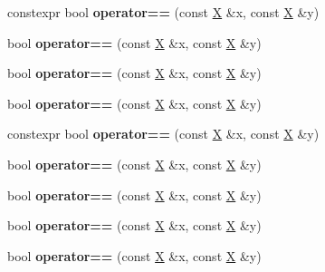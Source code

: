\begin{DoxyCompactItemize}
\item 
\mbox{\label{class_x_a9d441e76e2ab7afd90f64e49f2809fc7}} 
constexpr bool {\bfseries operator==} (const \mbox{\hyperlink{class_x}{X}} \&x, const \mbox{\hyperlink{class_x}{X}} \&y)
\item 
\mbox{\label{class_x_a1651e729cc70ea9942f074061b09216a}} 
bool {\bfseries operator==} (const \mbox{\hyperlink{class_x}{X}} \&x, const \mbox{\hyperlink{class_x}{X}} \&y)
\item 
\mbox{\label{class_x_a1651e729cc70ea9942f074061b09216a}} 
bool {\bfseries operator==} (const \mbox{\hyperlink{class_x}{X}} \&x, const \mbox{\hyperlink{class_x}{X}} \&y)
\item 
\mbox{\label{class_x_a1651e729cc70ea9942f074061b09216a}} 
bool {\bfseries operator==} (const \mbox{\hyperlink{class_x}{X}} \&x, const \mbox{\hyperlink{class_x}{X}} \&y)
\item 
\mbox{\label{class_x_a9d441e76e2ab7afd90f64e49f2809fc7}} 
constexpr bool {\bfseries operator==} (const \mbox{\hyperlink{class_x}{X}} \&x, const \mbox{\hyperlink{class_x}{X}} \&y)
\item 
\mbox{\label{class_x_a1651e729cc70ea9942f074061b09216a}} 
bool {\bfseries operator==} (const \mbox{\hyperlink{class_x}{X}} \&x, const \mbox{\hyperlink{class_x}{X}} \&y)
\item 
\mbox{\label{class_x_a1651e729cc70ea9942f074061b09216a}} 
bool {\bfseries operator==} (const \mbox{\hyperlink{class_x}{X}} \&x, const \mbox{\hyperlink{class_x}{X}} \&y)
\item 
\mbox{\label{class_x_a1651e729cc70ea9942f074061b09216a}} 
bool {\bfseries operator==} (const \mbox{\hyperlink{class_x}{X}} \&x, const \mbox{\hyperlink{class_x}{X}} \&y)
\item 
\mbox{\label{class_x_a1651e729cc70ea9942f074061b09216a}} 
bool {\bfseries operator==} (const \mbox{\hyperlink{class_x}{X}} \&x, const \mbox{\hyperlink{class_x}{X}} \&y)
\item 
\mbox{\label{class_x_a1651e729cc70ea9942f074061b09216a}} 

\end{DoxyCompactItemize}
